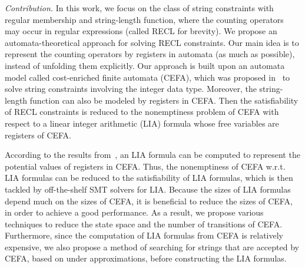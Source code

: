 
\medskip
\noindent 
\emph{Contribution.} In this work, we focus on the class of string constraints with regular membership and string-length function, where the counting operators may occur in regular expressions (called RECL for brevity). We propose an automata-theoretical approach for solving RECL constraints. Our main idea is to represent the counting operators by registers in automata (as much as possible), instead of unfolding them explicitly. Our approach is built upon an automata model called cost-enriched finite automata (CEFA), which was proposed in~\cite{atva2020} to solve string constraints involving the integer data type. Moreover, the string-length function can also be modeled by registers in CEFA. Then the satisfiability of RECL constraints is reduced to the nonemptiness problem of CEFA with respect to a linear integer arithmetic (LIA) formula whose free variables are registers of CEFA. 

According to the results from~\cite{atva2020}, an LIA formula can be computed to represent the potential values of registers in CEFA. Thus, the nonemptiness of CEFA w.r.t. LIA formulas can be reduced to the satisfiability of LIA formulas, which is then tackled by off-the-shelf SMT solvers for LIA. 
%
Because the sizes of LIA formulas depend much on the sizes of CEFA, it is beneficial to reduce the sizes of CEFA, in order to achieve a good performance. As a result, we propose various techniques to reduce the state space and the number of transitions of CEFA. Furthermore, since the computation of LIA formulas from CEFA is relatively expensive, we also propose a method of searching for strings that are accepted by CEFA, based on under approximations, before constructing the LIA formulas.  

